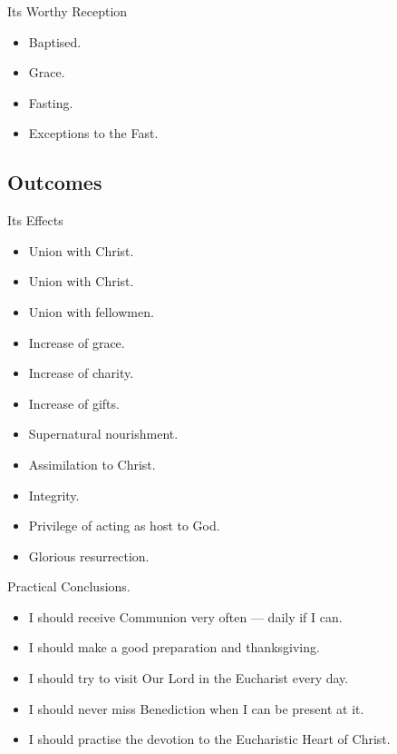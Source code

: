 \documentclass{beamer}
\begin{document}
\begin{frame}{Its Worthy Reception}
\begin{itemize}
\item Baptised.
\item Grace.
\item Fasting.
\item Exceptions to the Fast.
\end{itemize}
\end{frame}

\subsection{Outcomes}

\begin{frame}{Its Effects}
\begin{itemize}
\item Union with Christ.
\item Union with Christ.
\item Union with fellowmen. 
\item Increase of grace.
\item Increase of charity. 
\item Increase of gifts. 
\item Supernatural nourishment. 
\item Assimilation to Christ.
\item Integrity.
\item Privilege of acting as host to God.
\item Glorious resurrection.
\end{itemize}
\end{frame}

\begin{frame}{Practical Conclusions.}
\begin{itemize}
\item I should receive Communion very often --- daily if I can.
\item I should make a good preparation and thanksgiving.
\item I should try to visit Our Lord in the Eucharist every day.
\item I should never miss Benediction when I can be present at it.
\item I should practise the devotion to the Eucharistic Heart of Christ.
\end{itemize}
\end{frame}
\end{document}
